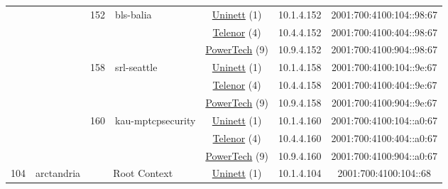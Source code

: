 \begin{small}
\begin{center}
\begin{longtable}{|c|c|c|c|c|c|c|c|}
  &  & \multirow{3}{*}{\tiny{152}} & \multicolumn{1}{|l|}{\multirow{3}{*}{\tiny{bls-balia}}} & \multicolumn{2}{|c|}{\tiny{\href{https://www.uninett.no}{Uninett} (1)}} & \tiny{10.1.4.152} & \tiny{2001:700:4100:104::98:67} \\* \cline{5-5}\cline{6-6}\cline{7-7}\cline{8-8}
  &  &  &  & \multicolumn{2}{|c|}{\tiny{\href{https://www.telenor.no}{Telenor} (4)}} & \tiny{10.4.4.152} & \tiny{2001:700:4100:404::98:67} \\* \cline{5-5}\cline{6-6}\cline{7-7}\cline{8-8}
  &  &  &  & \multicolumn{2}{|c|}{\tiny{\href{http://www.powertech.no}{PowerTech} (9)}} & \tiny{10.9.4.152} & \tiny{2001:700:4100:904::98:67} \\* \cline{3-3}\cline{4-4}\cline{5-5}\cline{6-6}\cline{7-7}\cline{8-8}
  &  & \multirow{3}{*}{\tiny{158}} & \multicolumn{1}{|l|}{\multirow{3}{*}{\tiny{srl-seattle}}} & \multicolumn{2}{|c|}{\tiny{\href{https://www.uninett.no}{Uninett} (1)}} & \tiny{10.1.4.158} & \tiny{2001:700:4100:104::9e:67} \\* \cline{5-5}\cline{6-6}\cline{7-7}\cline{8-8}
  &  &  &  & \multicolumn{2}{|c|}{\tiny{\href{https://www.telenor.no}{Telenor} (4)}} & \tiny{10.4.4.158} & \tiny{2001:700:4100:404::9e:67} \\* \cline{5-5}\cline{6-6}\cline{7-7}\cline{8-8}
  &  &  &  & \multicolumn{2}{|c|}{\tiny{\href{http://www.powertech.no}{PowerTech} (9)}} & \tiny{10.9.4.158} & \tiny{2001:700:4100:904::9e:67} \\* \cline{3-3}\cline{4-4}\cline{5-5}\cline{6-6}\cline{7-7}\cline{8-8}
  &  & \multirow{3}{*}{\tiny{160}} & \multicolumn{1}{|l|}{\multirow{3}{*}{\tiny{kau-mptcpsecurity}}} & \multicolumn{2}{|c|}{\tiny{\href{https://www.uninett.no}{Uninett} (1)}} & \tiny{10.1.4.160} & \tiny{2001:700:4100:104::a0:67} \\* \cline{5-5}\cline{6-6}\cline{7-7}\cline{8-8}
  &  &  &  & \multicolumn{2}{|c|}{\tiny{\href{https://www.telenor.no}{Telenor} (4)}} & \tiny{10.4.4.160} & \tiny{2001:700:4100:404::a0:67} \\* \cline{5-5}\cline{6-6}\cline{7-7}\cline{8-8}
  &  &  &  & \multicolumn{2}{|c|}{\tiny{\href{http://www.powertech.no}{PowerTech} (9)}} & \tiny{10.9.4.160} & \tiny{2001:700:4100:904::a0:67} \\ \hline
 \multirow{27}{*}{\tiny{104}} & \multicolumn{1}{|l|}{\multirow{27}{*}{\tiny{arctandria}}} & \multicolumn{2}{|c|}{\multirow{3}{*}{\tiny{Root Context}}} & \multicolumn{2}{|c|}{\tiny{\href{https://www.uninett.no}{Uninett} (1)}} & \tiny{10.1.4.104} & \tiny{2001:700:4100:104::68} \\* \cline{5-5}\cline{6-6}\cline{7-7}\cline{8-8}

\end{longtable}
\end{center}
\end{small}
